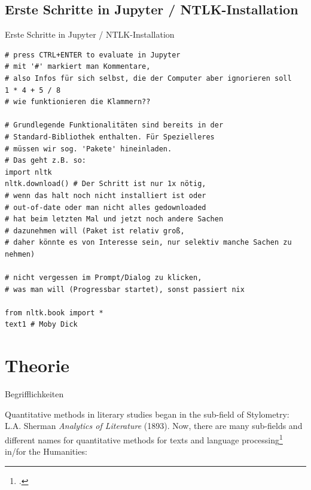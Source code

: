 \documentclass[10pt]{beamer}
\begin{document}
\subsection{Erste Schritte in Jupyter / NTLK-Installation}
\begin{frame}{Erste Schritte in Jupyter / NTLK-Installation}
\begin{verbatim}
# press CTRL+ENTER to evaluate in Jupyter
# mit '#' markiert man Kommentare, 
# also Infos für sich selbst, die der Computer aber ignorieren soll
1 * 4 + 5 / 8
# wie funktionieren die Klammern??

# Grundlegende Funktionalitäten sind bereits in der
# Standard-Bibliothek enthalten. Für Spezielleres 
# müssen wir sog. 'Pakete' hineinladen. 
# Das geht z.B. so:
import nltk 
nltk.download() # Der Schritt ist nur 1x nötig, 
# wenn das halt noch nicht installiert ist oder 
# out-of-date oder man nicht alles gedownloaded 
# hat beim letzten Mal und jetzt noch andere Sachen
# dazunehmen will (Paket ist relativ groß, 
# daher könnte es von Interesse sein, nur selektiv manche Sachen zu nehmen)

# nicht vergessen im Prompt/Dialog zu klicken, 
# was man will (Progressbar startet), sonst passiert nix

from nltk.book import *
text1 # Moby Dick
\end{verbatim}
    
\end{frame}

\section{Theorie}
\begin{frame}{Begrifflichkeiten}
    
Quantitative methods in literary studies began in the sub-field of Stylometry: 
L.A. Sherman \emph{Analytics of Literature} (1893).  Now, there are many sub-fields and different names for quantitative methods for texts and language processing\footcite[\scriptsize A fascinating introductory read on the `statistical language model', underlying computerized language processing, is][\scriptsize Don't be put off by the emphasis on mathematics, it's really a series of easy-to-understand blog posts about langauge processing.]{beautyOfMathematics} in/for the Humanities:

 



\end{frame}
\end{document}
